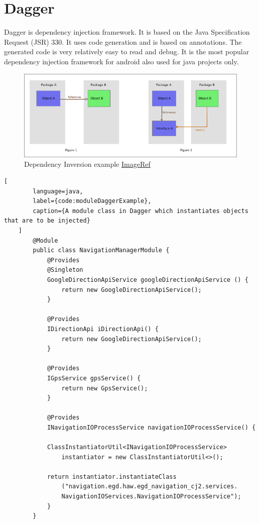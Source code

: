 \newpage
    \section{Dagger}
        \label{appendix:dagger}
        Dagger is dependency injection framework. It is based on the 
        Java Specification Request (JSR) 330. 
        It uses code generation and is based 
        on annotations. The generated code is very relatively easy to read 
        and debug. It is the most popular dependency injection framework
        for android also used for java projects only.

        
    \begin{figure}[htbp!]
        \centering \includegraphics[scale=0.85]{grafiken/di.jpg}
        \caption{Dependency Inversion example
        \href{https://upload.wikimedia.org/wikipedia/commons/9/96/Dependency_inversion.png}{ImageRef}}
        \label{fig:DIExample}
    \end{figure}

    \newpage
    \begin{lstlisting}[
        language=java,
        label={code:moduleDaggerExample},
        caption={A module class in Dagger which instantiates objects that are to be injected}
    ]
        @Module
        public class NavigationManagerModule {
            @Provides
            @Singleton
            GoogleDirectionApiService googleDirectionApiService () {
                return new GoogleDirectionApiService();
            }

            @Provides
            IDirectionApi iDirectionApi() {
                return new GoogleDirectionApiService();
            }

            @Provides
            IGpsService gpsService() {
                return new GpsService();
            }

            @Provides
            INavigationIOProcessService navigationIOProcessService() {
                
            ClassInstantiatorUtil<INavigationIOProcessService> 
                instantiator = new ClassInstantiatorUtil<>();

            return instantiator.instantiateClass
                ("navigation.egd.haw.egd_navigation_cj2.services.
                NavigationIOServices.NavigationIOProcessService");
            }
        }
    \end{lstlisting}

